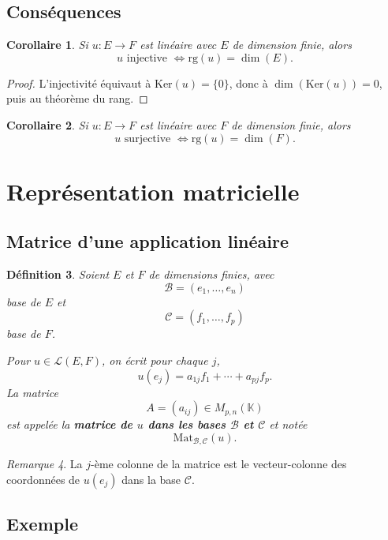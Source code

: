 \documentclass[11pt,a4paper]{article}
\newtheorem{definition}{Définition}[section]
\newtheorem{corollaire}[definition]{Corollaire}
\theoremstyle{remark}
\newtheorem{remarque}[definition]{Remarque}
\newcommand{\K}{\mathbb{K}}
\newcommand{\Ker}{\mathrm{Ker}}
\newcommand{\rg}{\mathrm{rg}}
\newcommand{\Lin}{\mathcal{L}}
\begin{document}
\subsection{Conséquences}

\begin{corollaire}
Si \(u:E\to F\) est linéaire avec \(E\) de dimension finie, alors
\[
u \text{ injective } \Longleftrightarrow \rg(u)=\dim(E).
\]
\end{corollaire}

\begin{proof}
L’injectivité équivaut à \(\Ker(u)=\{0\}\), donc à \(\dim(\Ker(u))=0\), puis au théorème du rang.
\end{proof}

\begin{corollaire}
Si \(u:E\to F\) est linéaire avec \(F\) de dimension finie, alors
\[
u \text{ surjective } \Longleftrightarrow \rg(u)=\dim(F).
\]
\end{corollaire}

\section{Représentation matricielle}

\subsection{Matrice d’une application linéaire}

\begin{definition}
Soient \(E\) et \(F\) de dimensions finies, avec
\[
\mathcal B=(e_1,\dots,e_n)
\]
base de \(E\) et
\[
\mathcal C=(f_1,\dots,f_p)
\]
base de \(F\).

Pour \(u\in\Lin(E,F)\), on écrit pour chaque \(j\),
\[
u(e_j)=a_{1j}f_1+\cdots+a_{pj}f_p.
\]
La matrice
\[
A=(a_{ij})\in M_{p,n}(\K)
\]
est appelée la \textbf{matrice de \(u\) dans les bases \(\mathcal B\) et \(\mathcal C\)} et notée
\[
\mathrm{Mat}_{\mathcal B,\mathcal C}(u).
\]
\end{definition}

\begin{remarque}
La \(j\)-ème colonne de la matrice est le vecteur-colonne des coordonnées de \(u(e_j)\) dans la base \(\mathcal C\).
\end{remarque}

\subsection{Exemple}
\end{document}

